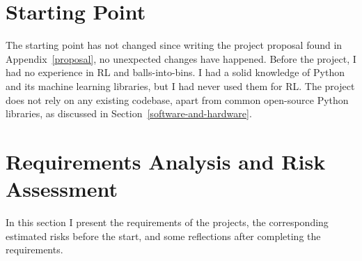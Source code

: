 \section{Starting Point}

The starting point has not changed since writing the project proposal found in Appendix~\ref{proposal}, no unexpected changes have happened. Before the project, I had no experience in RL and balls-into-bins. I had a solid knowledge of Python and its machine learning libraries, but I had never used them for RL. The project does not rely on any existing codebase, apart from common open-source Python libraries, as discussed in Section~\ref{software-and-hardware}.


\section{Requirements Analysis and Risk Assessment}

In this section I present the requirements of the projects, the corresponding estimated risks before the start, and some reflections after completing the requirements.

